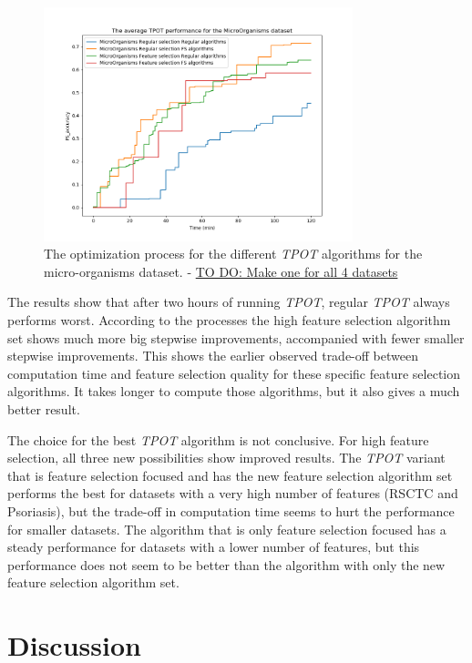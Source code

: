 \documentclass[10pt,a4paper]{report}
\begin{document}
	\begin{figure}[H]
		\centering
		\includegraphics[width=0.8\textwidth]{TPOT_avg_MO.PNG}
		\caption{The optimization process for the different \textit{TPOT} algorithms for the micro-organisms dataset. - \underline{TO DO: Make one for all 4 datasets}}
		\label{fig:TPOTResultMO}
	\end{figure}
	
	The results show that after two hours of running \textit{TPOT}, regular \textit{TPOT} always performs worst. According to the processes the high feature selection algorithm set shows much more big stepwise improvements, accompanied with fewer smaller stepwise improvements. This shows the earlier observed trade-off between computation time and feature selection quality for these specific feature selection algorithms. It takes longer to compute those algorithms, but it also gives a much better result. 
	
	The choice for the best \textit{TPOT} algorithm is not conclusive. For high feature selection, all three new possibilities show improved results. The \textit{TPOT} variant that is feature selection focused and has the new feature selection algorithm set performs the best for datasets with a very high number of features (RSCTC and Psoriasis), but the trade-off in computation time seems to hurt the performance for smaller datasets. The algorithm that is only feature selection focused has a steady performance for datasets with a lower number of features, but this performance does not seem to be better than the algorithm with only the new feature selection algorithm set.

	\section{Discussion}
	\label{FSsec:Discussion}
	
\end{document}
